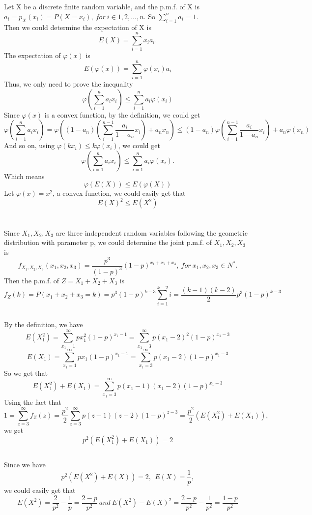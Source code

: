 \documentclass[10.5pt]{article}
\begin{document}
\section{}
Let X be a discrete finite random variable, and the p.m.f. of X is $a_i = p_X(x_i) = P(X=x_i), ~for ~i \in{1,2,\dots,n}$. So $\sum_{i=1}^n a_i =1$.\\\indent 
Then we could determine the expectation of X is $$E(X) = \sum_{i=1}^n x_ia_i.$$\indent
The expectation of $\varphi(x)$ is $$E(\varphi(x)) = \sum_{i=1}^n \varphi(x_i) a_i$$\indent
Thus, we only need to prove the inequality $$\varphi\left(\sum_{i=1}^{n} a_i x_i\right) \leqslant \sum_{i=1}^n a_i \varphi(x_i)$$\indent
Since $\varphi(x)$ is a convex function, by the definition, we could get $$\varphi\left(\sum_{i=1}^{n} a_i x_i\right) = \varphi\left((1-a_n)\left(\sum_{i=1}^{n-1} \frac{a_i}{1-a_n} x_i\right) + a_n x_n\right) \leqslant (1-a_n)\varphi\left(\sum_{i=1}^{n-1} \frac{a_i}{1-a_n} x_i\right) + a_n\varphi(x_n)$$\indent
And so on, using $\varphi(kx_i) \leqslant k\varphi(x_i)$, we could get $$\varphi\left(\sum_{i=1}^{n} a_i x_i\right) \leqslant \sum_{i=1}^n a_i \varphi(x_i).$$\indent
Which means $$\varphi\left(E(X)\right) \leqslant E\left(\varphi(X)\right)$$\indent
Let $\varphi(x) = x^2$, a convex function, we could easily get that $$E(X)^2\leqslant E(X^2)$$

\section{}
\subsection{}
Since $X_1,X_2,X_3$ are three independent random variables following the geometric distribution with parameter p, we could determine the joint p.m.f. of $X_1,X_2,X_3$ is $$f_{X_1,X_2,X_3}(x_1,x_2,x_3) = \frac{p^3}{(1-p)^3} (1-p)^{x_1+x_2+x_3},~for~x_1,x_2,x_3\in N^*.$$\indent
Then the p.m.f. of $Z = X_1+X_2+X_3$ is $$f_Z(k) = P(x_1+x_2+x_3= k) = p^3(1-p)^{k-3} \sum_{i=1}^{k-2} i = \frac{(k-1)(k-2)}{2}p^3(1-p)^{k-3}$$\indent
\subsection{}
By the definition, we have $$E(X_1^2) = \sum_{x_1=1}^{\infty} p x_1^2 (1-p)^{x_1-1} = \sum_{x_1=3}^{\infty} p (x_1-2)^2 (1-p)^{x_1-3}$$ $$E(X_1) = \sum_{x_1=1}^{\infty} p x_1 (1-p)^{x_1-1} = \sum_{x_1=3}^{\infty} p (x_1-2) (1-p)^{x_1-3}$$\indent
So we get that $$E(X_1^2) + E(X_1) = \sum_{x_1=3}^{\infty} p (x_1-1)(x_1-2) (1-p)^{x_1-3}$$\indent
Using the fact that $$1 = \sum_{z=3}^{\infty} f_Z(z) = \frac{p^2}{2} \sum_{z=3}^{\infty} p (z-1)(z-2) (1-p)^{z-3} = \frac{p^2}{2} \left(E(X_1^2) + E(X_1)\right),$$\indent
we get $$p^2 \left(E(X_1^2) + E(X_1)\right) = 2$$
\subsection{}
Since we have $$p^2(E(X^2)+E(X)) = 2, ~~E(X) = \frac{1}{p},$$\indent
we could easily get that $$E(X^2) = \frac{2}{p^2} - \frac{1}{p} = \frac{2-p}{p^2}~and~E(X^2)-E(X)^2 = \frac{2-p}{p^2}-\frac{1}{p^2} = \frac{1-p}{p^2}$$
\end{document}
